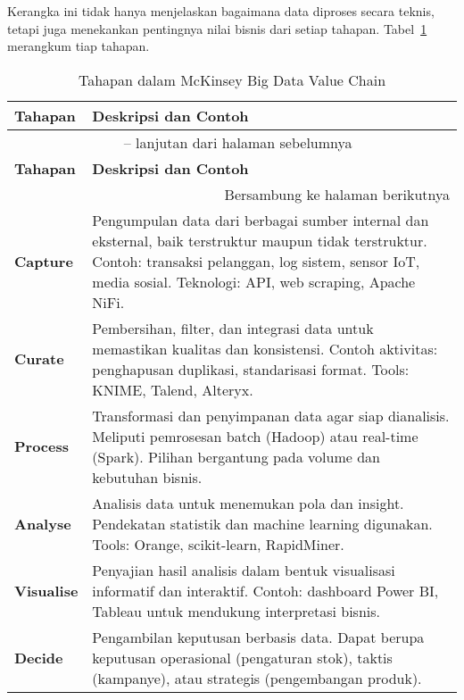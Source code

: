 Kerangka ini tidak hanya menjelaskan bagaimana data diproses secara teknis, tetapi juga menekankan pentingnya nilai bisnis dari setiap tahapan. Tabel~\ref{tab:mckinsey_value_chain} merangkum tiap tahapan.

\begin{longtable}{|p{}|p{}|}
	\caption{Tahapan dalam McKinsey Big Data Value Chain}
	\label{tab:mckinsey_value_chain} \\
	\hline
	\textbf{Tahapan} & \textbf{Deskripsi dan Contoh} \\
	\hline
	\endfirsthead
	
	\multicolumn{2}{c}{{\tablename\ \thetable{} -- lanjutan dari halaman sebelumnya}} \\
	\hline
	\textbf{Tahapan} & \textbf{Deskripsi dan Contoh} \\
	\hline
	\endhead
	
	\hline \multicolumn{2}{r}{{Bersambung ke halaman berikutnya}} \\
	\endfoot
	
	\hline
	\endlastfoot
	
	\textbf{Capture} &
	Pengumpulan data dari berbagai sumber internal dan eksternal, baik terstruktur maupun tidak terstruktur. Contoh: transaksi pelanggan, log sistem, sensor IoT, media sosial. Teknologi: API, web scraping, Apache NiFi. \\
	\hline
	\textbf{Curate} &
	Pembersihan, filter, dan integrasi data untuk memastikan kualitas dan konsistensi. Contoh aktivitas: penghapusan duplikasi, standarisasi format. Tools: KNIME, Talend, Alteryx. \\
	\hline
	\textbf{Process} &
	Transformasi dan penyimpanan data agar siap dianalisis. Meliputi pemrosesan batch (Hadoop) atau real-time (Spark). Pilihan bergantung pada volume dan kebutuhan bisnis. \\
	\hline
	\textbf{Analyse} &
	Analisis data untuk menemukan pola dan insight. Pendekatan statistik dan machine learning digunakan. Tools: Orange, scikit-learn, RapidMiner. \\
	\hline
	\textbf{Visualise} &
	Penyajian hasil analisis dalam bentuk visualisasi informatif dan interaktif. Contoh: dashboard Power BI, Tableau untuk mendukung interpretasi bisnis. \\
	\hline
	\textbf{Decide} &
	Pengambilan keputusan berbasis data. Dapat berupa keputusan operasional (pengaturan stok), taktis (kampanye), atau strategis (pengembangan produk). \\
	\hline
	
\end{longtable}


